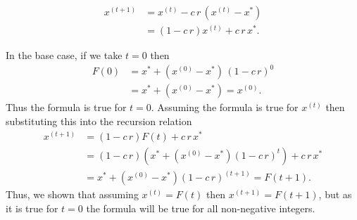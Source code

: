 \documentclass{sotonExamBoxes}    %
\newcommand{\bra}[1]{\left(#1\right)}
\begin{document}
\begin{question}{15}
  \begin{qparts}
      \begin{answer}
        \begin{align*}
          x^{(t+1)} &=x^{(t)} - c\,r\,(x^{(t)}-x^*) \\
                      &=(1-c\,r) x^{(t)} + c\,r\,x^*.
        \end{align*}
      \end{answer}
      \begin{answer}
        In the base case, if we take $t=0$ then
        \begin{align*}
          F(0) &= x^* + (x^{(0)}-x^*)\,(1-c\,r)^0 \\
          &= x^* + (x^{(0)}-x^*) = x^{(0)}.
        \end{align*}
        Thus the formula is true for $t=0$.  Assuming the formula is
        true for $x^{(t)}$ then substituting this into the recursion
        relation
        \begin{align*}
          x^{(t+1)} &=(1-c\,r) F(t) + c\,r\,x^*\\
          &= (1-c\,r) \bra{x^* + (x^{(0)}-x^*)(1-c\,r)^t} +
                      c\,r\,x^* \\
          &= x^* + (x^{(0)}-x^*)(1-c\,r)^{(t+1)} = F(t+1).
        \end{align*}
        Thus, we shown that assuming $x^{(t)} = F(t)$ then $x^{(t+1)}
        = F(t+1)$, but as it is true for $t=0$ the formula will be
        true for all non-negative integers.


\end{answer}
\end{qparts}
\end{question}
\end{document}
